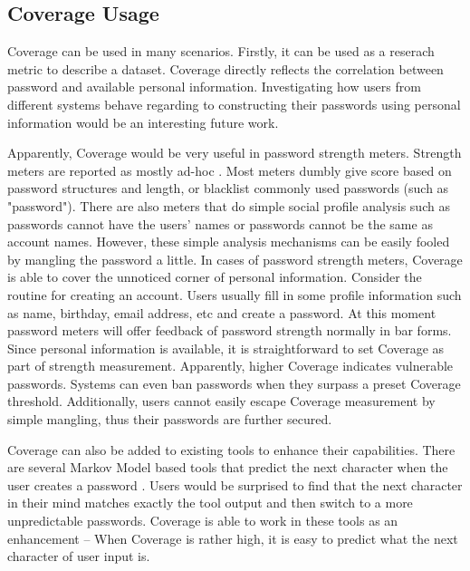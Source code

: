 \documentclass{sig-alternate}
\begin{document}
\subsection{Coverage Usage}
Coverage can be used in many scenarios. Firstly, it can be used as a reserach metric to describe a dataset. Coverage directly reflects the correlation between password and available personal information. Investigating how users from different systems behave regarding to constructing their passwords using personal information would be an interesting future work. 

Apparently, Coverage would be very useful in password strength meters. Strength meters are reported as mostly ad-hoc \cite{de2014very}. Most meters dumbly give score based on password structures and length, or blacklist commonly used passwords (such as "password"). There are also meters that do simple social profile analysis such as passwords cannot have the users' names or passwords cannot be the same as account names. However, these simple analysis mechanisms can be easily fooled by mangling the password a little. In cases of password strength meters, Coverage is able to cover the unnoticed corner of personal information. Consider the routine for creating an account. Users usually fill in some profile information such as name, birthday, email address, etc and create a password. At this moment password meters will offer feedback of password strength normally in bar forms. Since personal information is available, it is straightforward to set Coverage as part of strength measurement. Apparently, higher Coverage indicates vulnerable passwords. Systems can even ban passwords when they surpass a preset Coverage threshold. Additionally, users cannot easily escape Coverage measurement by simple mangling, thus their passwords are further secured. 

Coverage can also be added to existing tools to enhance their capabilities. There are several Markov Model based tools that predict the next character when the user creates a password \cite{komanduri2014telepathwords}\cite{weir2010testing}. Users would be surprised to find that the next character in their mind matches exactly the tool output and then switch to a more unpredictable passwords. Coverage is able to work in these tools as an enhancement -- When Coverage is rather high, it is easy to predict what the next character of user input is.
\end{document}
